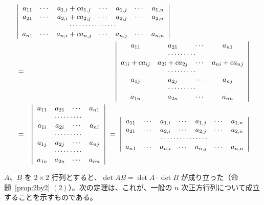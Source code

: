 {\small
\begin{eqnarray*}
\lefteqn{\left|\begin{array}{ccccccc}
a_{11} & \cdots & a_{1,i}+ca_{1,j} & \cdots & a_{1,j} & \cdots & a_{1,n}\\
a_{21} & \cdots & a_{2,i}+ca_{2,j} & \cdots & a_{2,j} & \cdots & a_{2,n}\\
\multicolumn{7}{c}{\cdots\cdots\cdots\cdots\cdots}\\
a_{n1} & \cdots & a_{n,i}+ca_{n,j} & \cdots & a_{n,j} & \cdots & a_{n,n}
\end{array}\right|}\\
 & = & 
\left|\begin{array}{cccc}a_{11} & a_{21} & \cdots & a_{n1} \\
\multicolumn{4}{c}{\cdots\cdots\cdots}\\
a_{1i}+ca_{ij} & a_{2i}+ca_{2j} & \cdots & a_{ni}+ca_{nj}\\
\multicolumn{4}{c}{\cdots\cdots\cdots}\\
a_{1j} & a_{2j} & \cdots & a_{nj} \\
\multicolumn{4}{c}{\cdots\cdots\cdots}\\
a_{1n} & a_{2n} & \cdots & a_{nn}
\end{array}\right|\\
 & =  &
\left|\begin{array}{cccc}a_{11} & a_{21} & \cdots & a_{n1} \\
\multicolumn{4}{c}{\cdots\cdots\cdots}\\
a_{1i} & a_{2i} & \cdots & a_{ni}\\
\multicolumn{4}{c}{\cdots\cdots\cdots}\\
a_{1j} & a_{2j} & \cdots & a_{nj} \\
\multicolumn{4}{c}{\cdots\cdots\cdots}\\
a_{1n} & a_{2n} & \cdots & a_{nn}
\end{array}\right|
\; = \;
\left|\begin{array}{ccccccc}
a_{11} & \cdots & a_{1,i} & \cdots & a_{1,j} & \cdots & a_{1,n}\\
a_{21} & \cdots & a_{2,i} & \cdots & a_{2,j} & \cdots & a_{2,n}\\
\multicolumn{7}{c}{\cdots\cdots\cdots\cdots\cdots}\\
a_{n1} & \cdots & a_{n,i} & \cdots & a_{n,j} & \cdots & a_{n,n}
\end{array}\right|
\end{eqnarray*}
}

\medskip
$A$、$B$ を $2\times 2$ 行列とすると、$\det AB = \det A\cdot\det B$ が成り立った（命題~\ref{prop:2by2} $(2)$）。次の定理は、これが、一般の $n$ 次正方行列について成立することを示すものである。

